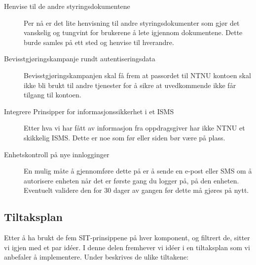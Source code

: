 \begin{description}
\item[Henvise til de andre styringsdokumentene]
Per nå er det lite henvisning til andre styringsdokumenter som gjør det vanskelig og tungvint for brukerene å lete igjennom dokumentene. Dette burde samles på ett sted og henvise til hverandre.

\item[Bevisstgjøringskampanje rundt autentiseringsdata]
Bevisstgjøringskampanjen skal få frem at passordet til NTNU kontoen skal ikke bli brukt til andre tjenester for å sikre at uvedkommende ikke får tilgang til kontoen.

\item[Integrere Prinsipper for informasjonssikkerhet i et ISMS]
Etter hva vi har fått av informasjon fra oppdragsgiver har ikke NTNU et skikkelig ISMS. Dette er noe som før eller siden bør være på plass. 

\item[Enhetskontroll på nye innlogginger]
En mulig måte å gjennomføre dette på er å sende en e-post eller SMS om å autorisere enheten når det er første gang du logger på, på den enheten. Eventuelt validere den for 30 dager av gangen før dette må gjøres på nytt. 
\end{description}

\subsection{Tiltaksplan}
Etter å ha brukt de fem SIT-prinsippene på hver komponent, og filtrert de, sitter vi igjen med et par idéer. I denne delen fremhever vi idéer i en tiltaksplan som vi anbefaler å implementere. 
Under beskrives de ulike tiltakene:

